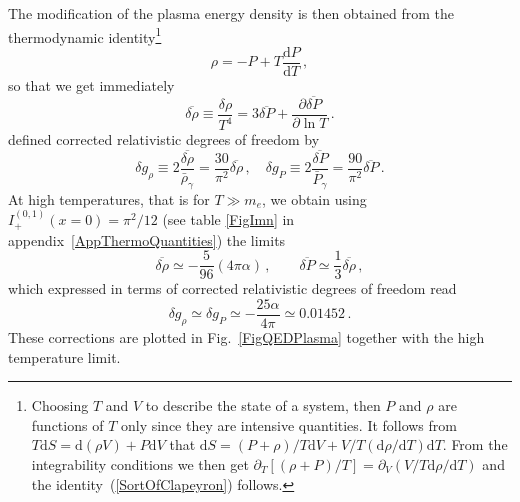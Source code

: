 \documentclass[onecolumn,float,floatfix,preprintnumbers,aps,rmp,nofootinbib,amsmath,amssymb,amsfonts,superscriptaddress,tightenlines]{revtex4}
\newcommand{\be}{\begin{equation}}
\newcommand{\ee}{\end{equation}}
\newcommand{\dd}{\mathrm{d}}
\begin{document}
The modification of the plasma energy density is then obtained from the thermodynamic identity\footnote{Choosing $T$ and $V$ to describe
  the state of a system, then $P$ and $\rho$ are functions of $T$ only
since they are intensive quantities. It follows from $T \dd S = \dd
(\rho V) + P \dd V$ that $\dd S = (P+\rho)/T \dd V+V/T (\dd \rho/\dd
T) \dd T$. From the integrability conditions we then get
$\partial_T[(\rho+P)/T]=\partial_V(V/T \dd \rho/\dd T)$ and the
identity~(\ref{SortOfClapeyron}) follows.}
\be\label{SortOfClapeyron}
\rho=-P + T \frac{\dd P}{\dd T}\,,
\ee
so that we get immediately
\be
\overline{\delta \rho}\equiv \frac{\delta \rho}{T^4} =
3\overline{\delta P} + \frac{\partial \overline{\delta P}}{\partial \ln
T}\,.
\ee
\citet{LopezTurner1998} defined corrected relativistic degrees of freedom by
\be
\delta g_\rho \equiv 2\frac{\overline{\delta
    \rho}}{\bar\rho_{\gamma}}=\frac{30}{\pi^2}\overline{\delta
    \rho}\,,\quad \delta g_P \equiv
  2\frac{\overline{\delta P}}{\bar P_{\gamma}}=\frac{90}{\pi^2}\overline{\delta
    P}\,.
\ee
At high temperatures, that is for $T \gg m_e$, we obtain using
$I_+^{(0,1)}(x=0)=\pi^2/12$ (see table \ref{FigImn} in appendix~\ref{AppThermoQuantities}) the limits
\be
\overline{\delta \rho} \simeq -\frac{5}{96}(4\pi\alpha)\,,\qquad \overline{\delta P} \simeq \frac{1}{3} \overline{\delta \rho} \,,
\ee
which expressed in terms of corrected relativistic degrees of freedom
read
\be
\delta g_\rho \simeq \delta g_P \simeq -\frac{25 \alpha}{4\pi}\simeq 0.01452\,.
\ee
These corrections are plotted in Fig.~\ref{FigQEDPlasma} together with
the high temperature limit. 
\end{document}
